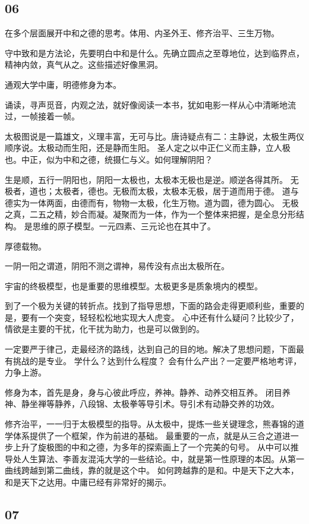 \subsection{06}

在多个层面展开中和之德的思考。体用、内圣外王、修齐治平、三生万物。

守中致和是方法论，先要明白中和是什么。先确立圆点之至尊地位，达到临界点，精神内敛，真气从之。这些描述好像黑洞。

通观大学中庸，明德修身为本。

诵读，寻声觅音，内观之法，就好像阅读一本书，犹如电影一样从心中清晰地流过，一帧接着一帧。

太极图说是一篇雄文，义理丰富，无可与比。唐诗疑点有二：主静说，太极生两仪顺序说。太极动而生阳，还是静而生阳。
圣人定之以中正仁义而主静，立人极也。中正，似为中和之德，统摄仁与义。如何理解阴阳？

生是顺，五行一阴阳也，阴阳一太极也，太极本无极也是逆。顺逆各得其所。
无极者，道也；太极者，德也。无极而太极，太极本无极，居于道而用于德。
道与德实为一体两面，由德而有，物物一太极，化生万物。道为圆，德为圆心。
无极之真，二五之精，妙合而凝。凝聚而为一体，作为一个整体来把握，是全息分形结构。
是思维的原子模型。一元四素、三元论也在其中了。

厚德载物。

一阴一阳之谓道，阴阳不测之谓神，易传没有点出太极所在。

宇宙的终极模型，也是重要的思维模型。太极更多是质象境内的模型。

到了一个极为关键的转折点。找到了指导思想，下面的路会走得更顺利些，重要的是，要有一个突变，轻轻松松地实现大人虎变。
心中还有什么疑问？比较少了，情欲是主要的干扰，化干扰为助力，也是可以做到的。

一定要严于律己，走最经济的路线，达到自己的目的地。解决了思想问题，下面最有挑战的是专业。
学什么？达到什么程度？ 会有什么产出？一定要严格地考评，力争上游。

修身为本，首先是身，身与心彼此呼应，养神。静养、动养交相互养。
闭目养神、静坐禅等静养，八段锦、太极拳等导引术。导引术有动静交养的功效。

修齐治平，一一归于太极模型的指导。从太极中，提炼一些关键理念，熊春锦的道学体系提供了一个框架，作为前进的基础。
最重要的一点，就是从三合之道进一步上升了旋极图的中和之德，为多年的探索画上了一个完美的句号。
从中可以推导处人生算法、李善友混沌大学的一些结论。中，就是第一性原理的本因。从第一曲线跨越到第二曲线，靠的就是这个中。
如何跨越靠的是和。中是天下之大本，和是天下之达用。中庸已经有非常好的揭示。

\subsection{07}

